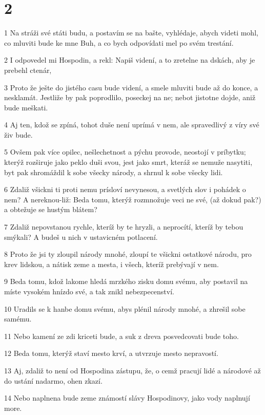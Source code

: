 \chapter{2}

\par 1 Na stráži své státi budu, a postavím se na bašte, vyhlédaje, abych videti mohl, co mluviti bude ke mne Buh, a co bych odpovídati mel po svém trestání.
\par 2 I odpovedel mi Hospodin, a rekl: Napiš videní, a to zretelne na dskách, aby je prebehl ctenár,
\par 3 Proto že ješte do jistého casu bude videní, a smele mluviti bude až do konce, a nesklamát. Jestliže by pak poprodlilo, poseckej na ne; nebot jistotne dojde, aniž bude meškati.
\par 4 Aj ten, kdož se zpíná, tohot duše není uprímá v nem, ale spravedlivý z víry své živ bude.
\par 5 Ovšem pak více opilec, nešlechetnost a pýchu provode, neostojí v príbytku; kterýž rozširuje jako peklo duši svou, jest jako smrt, kteráž se nemuže nasytiti, byt pak shromáždil k sobe všecky národy, a shrnul k sobe všecky lidi.
\par 6 Zdaliž všickni ti proti nemu prísloví nevynesou, a svetlých slov i pohádek o nem? A nereknou-liž: Beda tomu, kterýž rozmnožuje veci ne své, (až dokud pak?) a obtežuje se hustým blátem?
\par 7 Zdaliž nepovstanou rychle, kteríž by te hryzli, a neprocítí, kteríž by tebou smýkali? A budeš u nich v ustavicném potlacení.
\par 8 Proto že jsi ty zloupil národy mnohé, zloupí te všickni ostatkové národu, pro krev lidskou, a nátisk zeme a mesta, i všech, kteríž prebývají v nem.
\par 9 Beda tomu, kdož lakome hledá mrzkého zisku domu svému, aby postavil na míste vysokém hnízdo své, a tak znikl nebezpecenství.
\par 10 Uradils se k hanbe domu svému, abys plénil národy mnohé, a zhrešil sobe samému.
\par 11 Nebo kamení ze zdi kriceti bude, a suk z dreva posvedcovati bude toho.
\par 12 Beda tomu, kterýž staví mesto krví, a utvrzuje mesto nepravostí.
\par 13 Aj, zdaliž to není od Hospodina zástupu, že, o cemž pracují lidé a národové až do ustání nadarmo, ohen zkazí.
\par 14 Nebo naplnena bude zeme známostí slávy Hospodinovy, jako vody naplnují more.
